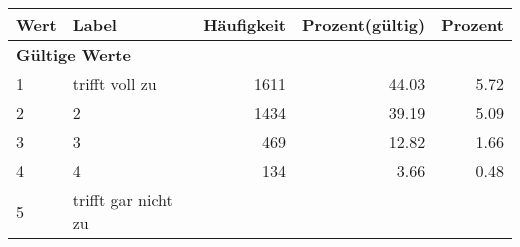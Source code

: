      \begin{longtable}{lXrrr}
     \toprule
     \textbf{Wert} & \textbf{Label} & \textbf{Häufigkeit} & \textbf{Prozent(gültig)} & \textbf{Prozent} \\
     \endhead
     \midrule
     \multicolumn{5}{l}{\textbf{Gültige Werte}}\\

     1 &
     \multicolumn{1}{X}{ trifft voll zu   } &


       \num{1611} &
       \num[round-mode=places,round-precision=2]{44.03} &
         \num[round-mode=places,round-precision=2]{5.72} \\

     2 &
     \multicolumn{1}{X}{ 2   } &


       \num{1434} &
       \num[round-mode=places,round-precision=2]{39.19} &
         \num[round-mode=places,round-precision=2]{5.09} \\

     3 &
     \multicolumn{1}{X}{ 3   } &


       \num{469} &
       \num[round-mode=places,round-precision=2]{12.82} &
         \num[round-mode=places,round-precision=2]{1.66} \\

     4 &
     \multicolumn{1}{X}{ 4   } &


       \num{134} &
       \num[round-mode=places,round-precision=2]{3.66} &
         \num[round-mode=places,round-precision=2]{0.48} \\

     5 &
     \multicolumn{1}{X}{ trifft gar nicht zu   } &



\end{longtable}
